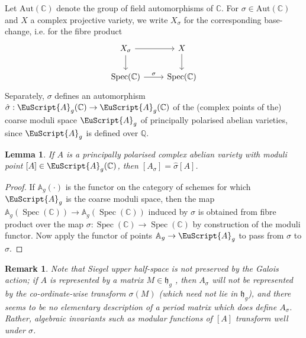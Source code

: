 \documentclass[11pt]{amsart}
\newtheorem{lemma}[thm]{Lemma}
\newtheorem{remark}[thm]{Remark}
\newcommand{\scrA}{\EuScript{A}}
\newcommand{\bA}{\mathbb{A}}
\newcommand{\bQ}{\mathbb{Q}}
\newcommand{\bC}{\mathbb{C}}
\newcommand{\Aut}{\mathrm{Aut}}
\numberwithin{equation}{section}
\newcommand{\Spec}{\operatorname{Spec}}
\begin{document}
Let $\Aut(\bC)$ denote the group of field automorphisms of $\bC$. For $\sigma \in \Aut(\bC)$ and $X$ a complex projective variety, we write $X_{\sigma}$ for the corresponding base-change, i.e. for the fibre product
\[
	\begin{tikzcd}
		X_{\sigma} \ar[r] \ar[d] & X \ar[d] \\
		\mathrm{Spec}(\bC) \ar[r,"\sigma"] & \mathrm{Spec}(\bC)
	\end{tikzcd}
\]
Separately, $\sigma$ defines an automorphism $\hat\sigma: \scrA_g(\bC) \to \scrA_g(\bC)$ of the (complex points of the) coarse moduli space $\scrA_g$ of principally polarised abelian varieties, since $\scrA_g$ is defined over $\bQ$.

\begin{lemma}
	If $A$ is a principally polarised complex abelian variety with moduli point $[A] \in \scrA_g(\bC)$, then $[A_{\sigma}] = \hat\sigma[A]$.
\end{lemma}

\begin{proof}
	If $\bA_g(\cdot)$ is the functor on the category of schemes for which $\scrA_g$ is the coarse moduli space, then the map $\bA_g(\Spec(\bC)) \to \bA_g(\Spec(\bC))$ induced by $\sigma$ is obtained from fibre product over the map $\sigma: \Spec(\bC) \to \Spec(\bC)$ by  construction of the moduli functor. Now apply the functor of points $\bA_g \to \scrA_g$ to pass from $\sigma$ to $\hat\sigma$.
\end{proof}

\begin{remark}
	Note that Siegel upper half-space is not preserved by the Galois action; if $A$ is represented by a matrix $M \in \mathfrak{h}_g$ , then $A_{\sigma}$ will not be represented by the co-ordinate-wise transform $\sigma(M)$ (which need not lie in $\mathfrak{h}_g$), and there seems to be no elementary description of a period matrix which does define $A_{\sigma}$. Rather, algebraic invariants such as modular functions of $[A]$ transform well under $\sigma$.
\end{remark}
\end{document}
